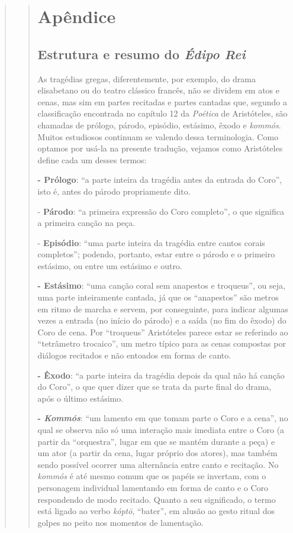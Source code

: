 \begin{verse}
\begin{verse}
\chapter{Apêndice} 

\section{Estrutura e resumo do \emph{Édipo Rei}}

As tragédias gregas, diferentemente, por exemplo, do drama elisabetano
ou do teatro clássico francês, não se dividem em atos e cenas, mas sim
em partes recitadas e partes cantadas que, segundo a classificação
encontrada no capítulo 12 da \emph{Poética} de Aristóteles, são chamadas
de prólogo, párodo, episódio, estásimo, êxodo e \emph{kommós}. Muitos
estudiosos continuam se valendo dessa terminologia. Como optamos por
usá-la na presente tradução, vejamos como Aristóteles define cada um
desses termos:

\textbf{- Prólogo}: ``a parte inteira da tragédia antes da entrada do
Coro'', isto é, antes do párodo propriamente dito.

- \textbf{Párodo}: ``a primeira expressão do Coro completo'', o que
significa a primeira canção na peça.

- \textbf{Episódio}: ``uma parte inteira da tragédia entre cantos corais
completos''; podendo, portanto, estar entre o párodo e o primeiro
estásimo, ou entre um estásimo e outro.

\textbf{- Estásimo}: ``uma canção coral sem anapestos e troqueus'', ou
seja, uma parte inteiramente cantada, já que os ``anapestos'' são metros
em ritmo de marcha e servem, por conseguinte, para indicar algumas vezes
a entrada (no início do párodo) e a saída (no fim do êxodo) do Coro de
cena. Por ``troqueus'' Aristóteles parece estar se referindo ao
``tetrâmetro trocaico'', um metro típico para as cenas compostas por
diálogos recitados e não entoados em forma de canto.

\textbf{- Êxodo}: ``a parte inteira da tragédia depois da qual não há
canção do Coro'', o que quer dizer que se trata da parte final do drama,
após o último estásimo.

\textbf{- \emph{Kommós}}: ``um lamento em que tomam parte o Coro e a
cena'', no qual se observa não só uma interação mais imediata entre o
Coro (a partir da ``orquestra'', lugar em que se mantém durante a peça) e um
ator (a partir da cena, lugar próprio dos atores), mas também sendo
possível ocorrer uma alternância entre canto e recitação. No
\emph{kommós} é até mesmo comum que os papéis se invertam, com o
personagem individual lamentando em forma de canto e o Coro respondendo
de modo recitado. Quanto a seu significado, o termo está ligado ao verbo
\emph{kóptō}, ``bater'', em alusão ao gesto ritual dos golpes no peito
nos momentos de lamentação.


\end{verse}
\end{verse}
